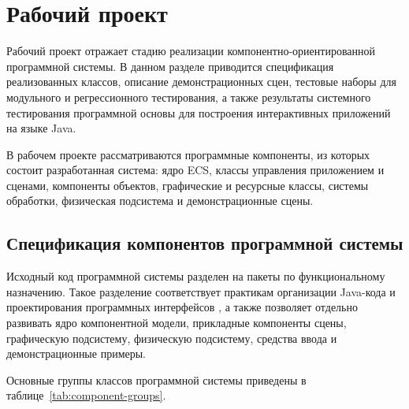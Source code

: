 \section{Рабочий проект}

Рабочий проект отражает стадию реализации компонентно-ориентированной
программной системы. В данном разделе приводится спецификация реализованных
классов, описание демонстрационных сцен, тестовые наборы для модульного и
регрессионного тестирования, а также результаты системного тестирования
программной основы для построения интерактивных приложений на языке Java.

В рабочем проекте рассматриваются программные компоненты, из которых состоит
разработанная система: ядро ECS, классы управления приложением и сценами,
компоненты объектов, графические и ресурсные классы, системы обработки,
физическая подсистема и демонстрационные сцены.

\subsection{Спецификация компонентов программной системы}

Исходный код программной системы разделен на пакеты по функциональному
назначению. Такое разделение соответствует практикам организации Java-кода и
проектирования программных интерфейсов \cite{bloch-effective-java,horstmann-java-core},
а также позволяет отдельно развивать ядро компонентной модели, прикладные
компоненты сцены, графическую подсистему, физическую подсистему, средства ввода
и демонстрационные примеры.

Основные группы классов программной системы приведены в таблице~\ref{tab:component-groups}.

